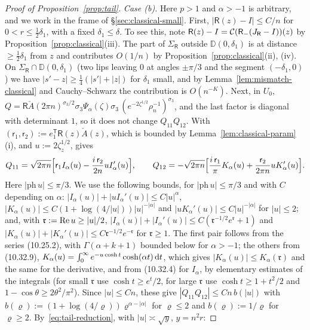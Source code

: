 \begin{proof}[Proof of Proposition~\ref{prop:tail}]
\emph{Case (b).} Here $p>1$ and $\alpha>-1$ is arbitrary, and we work in the frame of \S\ref{sec:classical-small}.
First, $|\mathsf R(z)-I|\le C/n$ for $0<r\le\frac12\delta_1$, with a fixed $\delta_1\le\delta$. To see this, note
$\mathsf R(z)-I=\mathcal{C}(\mathsf R_-(J_{\mathsf R}-I))(z)$ by Proposition~\ref{prop:classical}(iii). The part of
$\Sigma_{\mathsf R}$ outside $\mathbb D(0,\delta_1)$ is at distance $\ge\frac12\delta_1$ from $z$ and contributes $O(1/n)$
by Proposition~\ref{prop:classical}(ii), (iv). On $\Sigma_{\mathsf R}\cap \mathbb D(0,\delta_1)$ (two lips leaving $0$ at angles
$\pm\pi/3$ and the segment $(-\delta_1,0)$) we have $|s'-z|\ge\frac14(|s'|+|z|)$ for $\delta_1$ small, and by
Lemma~\ref{lem:mismatch-classical} and Cauchy--Schwarz the contribution is $O(n^{-K})$. Next, in $U_0$,
$Q=\mathsf R\check A(2\pi n)^{\sigma_3/2}\sigma_3\Psi_\alpha(\zeta)\sigma_3\,(e^{-2\zeta^{1/2}}\rho_n^{-1})^{\sigma_3}$, and the last
factor is diagonal with determinant $1$, so it does not change $Q_{11}Q_{12}$. With
$(\mathsf r_1,\mathsf r_2):=e_1^{\mathsf T}\mathsf R(z)\check A(z)$, which is bounded by Lemma~\ref{lem:classical-param}(i),
and $u:=2\zeta_z^{1/2}$, \cite[(6.23)]{KMVV} gives
\[
  Q_{11}=\sqrt{2\pi n}\Bigl[\mathsf r_1I_\alpha(u)-\frac{i\,\mathsf r_2}{2n}uI_\alpha'(u)\Bigr],\qquad
  Q_{12}=-\sqrt{2\pi n}\Bigl[\frac{i\,\mathsf r_1}\pi K_\alpha(u)+\frac{\mathsf r_2}{2\pi n}uK_\alpha'(u)\Bigr].
\]
Here $|\mathrm{ph}\,u|\le\pi/3$. We use the following bounds, for $|\mathrm{ph}\,u|\le\pi/3$ and with $C$ depending on $\alpha$:
$|I_\alpha(u)|+|uI_\alpha'(u)|\le C|u|^\alpha$, $|K_\alpha(u)|\le C(1+\log(4/|u|))|u|^{-|\alpha|}$ and $|uK_\alpha'(u)|\le
C|u|^{-|\alpha|}$ for $|u|\le2$; and, with $\mathfrak r:=\operatorname{Re} u\ge|u|/2$, $|I_\alpha(u)|+|I_\alpha'(u)|\le C(\mathfrak r^{-1/2}e^{\mathfrak r}+1)$
and $|K_\alpha(u)|+|K_\alpha'(u)|\le C\mathfrak r^{-1/2}e^{-\mathfrak r}$ for $\mathfrak r\ge1$. The first pair follows from the series
(10.25.2), with $\Gamma(\alpha+k+1)$ bounded below for $\alpha>-1$; the others from (10.32.9),
$K_\alpha(u)=\int_0^\infty e^{-u\cosh t}\cosh(\alpha t)\,\mathrm{d} t$, which gives $|K_\alpha(u)|\le K_\alpha(\mathfrak r)$ and the same for
the derivative, and from (10.32.4) for $I_\alpha$, by elementary estimates of the integrals (for small $\mathfrak r$ use
$\cosh t\ge e^t/2$, for large $\mathfrak r$ use $\cosh t\ge1+t^2/2$ and $1-\cos\theta\ge2\theta^2/\pi^2$). Since $|u|\le Cn$, these
give $|Q_{11}Q_{12}|\le Cn\,b(|u|)$ with $b(\varrho):=(1+\log(4/\varrho))\varrho^{\alpha-|\alpha|}$ for $\varrho\le2$ and $b(\varrho):=1/\varrho$
for $\varrho\ge2$. By~\eqref{eq:tail-reduction}, with $|u|\asymp\sqrt y$, $y=n^2r$:

\end{proof}
